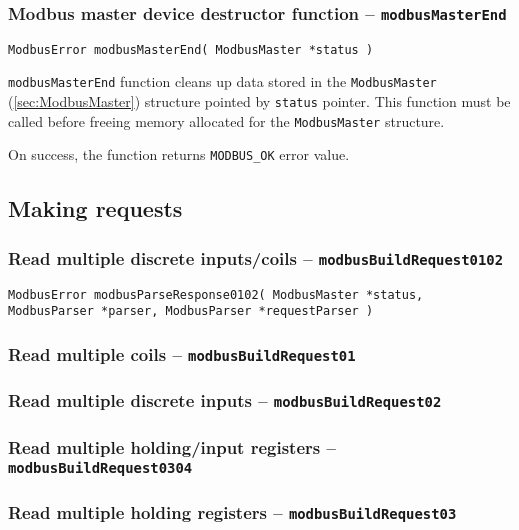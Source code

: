 \documentclass[11pt,a4paper]{article}
\newcommand{\coderef}[1]{\texttt{{#1}} (\ref{sec:#1})}
\begin{document}
\subsubsection{Modbus master device destructor function -- \texttt{modbusMasterEnd}}
\begin{lstlisting}[style=cproto]
ModbusError modbusMasterEnd( ModbusMaster *status )
\end{lstlisting}

\texttt{modbusMasterEnd} function cleans up data stored in the \coderef{ModbusMaster} structure pointed by \texttt{status} pointer. This function must be called before freeing memory allocated for the \texttt{ModbusMaster} structure.

On success, the function returns \texttt{MODBUS\_OK} error value.


\subsection{Making requests}
\subsubsection{Read multiple discrete inputs/coils -- \texttt{modbusBuildRequest0102}} \label{sec:modbusBuildRequest0102}
\begin{lstlisting}[style=cproto]
ModbusError modbusParseResponse0102( ModbusMaster *status, ModbusParser *parser, ModbusParser *requestParser )
\end{lstlisting}


\subsubsection{Read multiple coils -- \texttt{modbusBuildRequest01}} \label{sec:modbusBuildRequest01}
\subsubsection{Read multiple discrete inputs -- \texttt{modbusBuildRequest02}}  \label{sec:modbusBuildRequest02}
\subsubsection{Read multiple holding/input registers -- \texttt{modbusBuildRequest0304}} \label{sec:modbusBuildRequest0304}
\subsubsection{Read multiple holding registers -- \texttt{modbusBuildRequest03}} \label{sec:modbusBuildRequest03}
\end{document}
